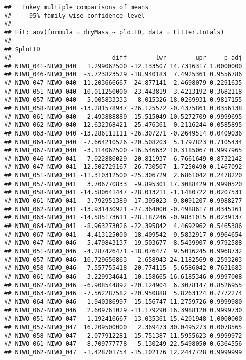 \documentclass[
]{article}
\begin{document}
\begin{verbatim}
##   Tukey multiple comparisons of means
##     95% family-wise confidence level
## 
## Fit: aov(formula = dryMass ~ plotID, data = Litter.Totals)
## 
## $plotID
##                            diff        lwr        upr     p adj
## NIWO_041-NIWO_040   1.299062500 -12.133507 14.7316317 1.0000000
## NIWO_046-NIWO_040  -5.723823529 -18.940183  7.4925361 0.9556786
## NIWO_047-NIWO_040 -11.203666667 -24.877141  2.4698079 0.2291635
## NIWO_051-NIWO_040 -10.011250000 -23.443819  3.4213192 0.3682118
## NIWO_057-NIWO_040   5.005833333  -8.015326 18.0269931 0.9817155
## NIWO_058-NIWO_040 -13.281578947 -26.125572 -0.4375861 0.0356138
## NIWO_061-NIWO_040  -2.493888889 -15.515049 10.5272709 0.9999695
## NIWO_062-NIWO_040 -12.632368421 -25.476361  0.2116244 0.0585895
## NIWO_063-NIWO_040 -13.286111111 -26.307271 -0.2649514 0.0409036
## NIWO_064-NIWO_040  -7.664210526 -20.508203  5.1797823 0.7105434
## NIWO_067-NIWO_040  -3.114062500 -16.546632 10.3185067 0.9997965
## NIWO_046-NIWO_041  -7.022886029 -20.811937  6.7661649 0.8732142
## NIWO_047-NIWO_041 -12.502729167 -26.730507  1.7250490 0.1467092
## NIWO_051-NIWO_041 -11.310312500 -25.306729  2.6861042 0.2478220
## NIWO_057-NIWO_041   3.706770833  -9.895301 17.3088429 0.9990520
## NIWO_058-NIWO_041 -14.580641447 -28.013211 -1.1480722 0.0207531
## NIWO_061-NIWO_041  -3.792951389 -17.395023  9.8091207 0.9988277
## NIWO_062-NIWO_041 -13.931430921 -27.364000 -0.4988617 0.0345161
## NIWO_063-NIWO_041 -14.585173611 -28.187246 -0.9831015 0.0239137
## NIWO_064-NIWO_041  -8.963273026 -22.395842  4.4692962 0.5465386
## NIWO_067-NIWO_041  -4.413125000 -18.409542  9.5832917 0.9964654
## NIWO_047-NIWO_046  -5.479843137 -19.503677  8.5439907 0.9792588
## NIWO_051-NIWO_046  -4.287426471 -18.076477  9.5016245 0.9968732
## NIWO_057-NIWO_046  10.729656863  -2.658943 24.1182569 0.2593203
## NIWO_058-NIWO_046  -7.557755418 -20.774115  5.6586042 0.7631683
## NIWO_061-NIWO_046   3.229934641 -10.158665 16.6185346 0.9997008
## NIWO_062-NIWO_046  -6.908544892 -20.124904  6.3078147 0.8526955
## NIWO_063-NIWO_046  -7.562287582 -20.950888  5.8263124 0.7772274
## NIWO_064-NIWO_046  -1.940386997 -15.156747 11.2759726 0.9999980
## NIWO_067-NIWO_046   2.609761029 -11.179290 16.3988120 0.9999730
## NIWO_051-NIWO_047   1.192416667 -13.035361 15.4201948 1.0000000
## NIWO_057-NIWO_047  16.209500000   2.369473 30.0495273 0.0078565
## NIWO_058-NIWO_047  -2.077912281 -15.751387 11.5955623 0.9999972
## NIWO_061-NIWO_047   8.709777778  -5.130249 22.5498050 0.6364556
## NIWO_062-NIWO_047  -1.428701754 -15.102176 12.2447728 0.9999999

\end{verbatim}
\end{document}
